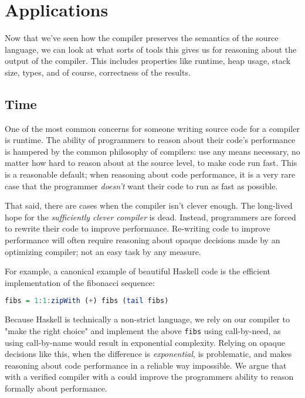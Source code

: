 \section{Applications} \label{sec:applications}

Now that we've seen how the compiler preserves the semantics of the source
language, we can look at what sorts of tools this gives us for reasoning about
the output of the compiler. This includes properties like runtime, heap usage,
stack size, types, and of course, correctness of the results.

\subsection{Time}

One of the most common concerns for someone writing source code for a compiler
is runtime. The ability of programmers to reason about their code's performance
is hampered by the common philosophy of compilers: use any means necessary, no
matter how hard to reason about at the source level, to make code run fast. This
is a reasonable default; when reasoning about code performance, it is a very
rare case that the programmer \emph{doesn't} want their code to run as fast as
possible. 

That said, there are cases when the compiler isn't clever enough. The long-lived
hope for the \emph{sufficiently clever compiler} is dead. Instead, programmers
are forced to rewrite their code to improve performance. Re-writing code to
improve performance will often require reasoning about opaque decisions made by
an optimizing compiler; not an easy task by any measure.

For example, a canonical example of beautiful Haskell code is the efficient
implementation of the fibonacci sequence: 

\begin{lstlisting}[language=Haskell]
fibs = 1:1:zipWith (+) fibs (tail fibs)
\end{lstlisting}

Because Haskell is technically a non-strict language, we rely on our compiler to
"make the right choice" and implement the above \texttt{fibs} using
call-by-need, as using call-by-name would result in exponential complexity.
Relying on opaque decisions like this, when the difference is
\emph{exponential}, is problematic, and makes reasoning about code performance
in a reliable way impossible. We argue that with a verified compiler with a
could improve the programmers ability to reason formally about performance. 

